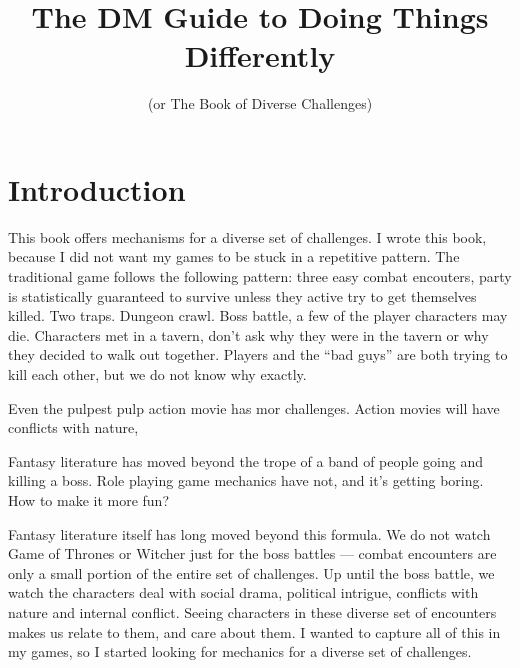 \documentclass[twocolumn]{dndbook}
\begin{document}
\title{The DM Guide to Doing Things Differently}
\subtitle{(or The Book of Diverse Challenges)}

\maketitle


\chapter{Introduction}

This book offers mechanisms for a diverse set of challenges.
I wrote this book, because I did not want my games to be stuck in a repetitive pattern.
The traditional game follows the following pattern: three easy combat encouters, party is statistically guaranteed to survive unless they active try to get themselves killed.
Two traps. Dungeon crawl. Boss battle, a few of the player characters may die.
Characters met in a tavern, don't ask why they were in the tavern or why they decided to walk out together.
Players and the ``bad guys'' are both trying to kill each other, but we do not know why exactly.\par

Even the pulpest pulp action movie has mor challenges.
Action movies will have conflicts with nature,

\begin{emphasisParagraph}
	Fantasy literature has moved beyond the trope of a band of people going and killing a boss.
	Role playing game mechanics have not, and it's getting boring.
	How to make it more fun?
\end{emphasisParagraph}


Fantasy literature itself has long moved beyond this formula.
We do not watch Game of Thrones or Witcher just for the boss battles --- combat encounters are only a small portion of the entire set of challenges.
Up until the boss battle, we watch the characters deal with social drama, political intrigue, conflicts with nature and internal conflict.
Seeing characters in these diverse set of encounters makes us relate to them, and care about them.
I wanted to capture all of this in my games, so I started looking for mechanics for a diverse set of challenges.\par
\end{document}
